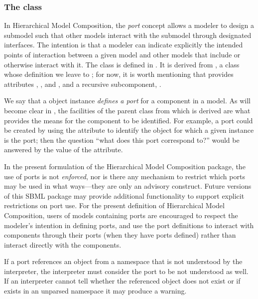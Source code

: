 \subsubsection{The  class}
\label{port-class}

In Hierarchical Model Composition, the \emph{port} concept allows a
modeler to design a submodel such that other models interact with the
submodel through designated interfaces.  The intention is that a modeler
can indicate explicitly the intended points of interaction between a
given model and other models that include or otherwise interact with it.
The \Port class is defined in .  It is derived
from \SBaseRef, a class whose definition we leave to
; for now, it is worth mentioning that \SBaseRef
provides attributes , ,  and
, and a recursive subcomponent, .

We say that a \Port object instance \emph{defines a port} for a
component in a model.  As will become clear in ,
the facilities of the \SBaseRef parent class from which \Port is derived
are what provides the means for the component to be identified.  For
example, a port could be created by using the 
attribute to identify the object for which a given \Port instance is the
port; then the question ``what does this port correspond to?'' would be
answered by the value of the  attribute.

In the present formulation of the Hierarchical Model Composition
package, the use of ports is not \emph{enforced}, nor is there any
mechanism to restrict which ports may be used in what ways---they are
only an advisory construct.  Future versions of this SBML package may
provide additional functionality to support explicit restrictions on
port use.  For the present definition of Hierarchical Model Composition,
users of models containing ports are encouraged to respect the modeler's
intention in defining ports, and use the port definitions to interact
with components through their ports (when they have ports defined)
rather than interact directly with the components.

If a port references an object from a namespace that is not understood
by the interpreter, the interpreter must consider the port to be not
understood as well.   If an interpreter cannot tell whether 
the referenced object does not exist or if exists in an unparsed namespace
it may produce a warning.

